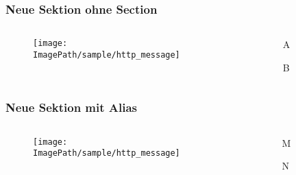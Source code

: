 
\begin{frame}
	\frametitle{Neue Sektion ohne Section}
	\begin{columns}
		\begin{column}{0.5\textwidth}
			\begin{figure}
				\centering
				\texttt{[image: \\ImagePath/sample/http\_message]}
			\end{figure}
		\end{column}
		\begin{column}{0.5\textwidth}
			\begin{steps}
				\item A
				\item B
			\end{steps}
		\end{column}
	\end{columns}
\end{frame}


\begin{frame}
	\frametitle{Neue Sektion mit Alias}
	\begin{columns}
		\begin{column}{0.5\textwidth}
			\begin{figure}
				\centering
				\texttt{[image: \\ImagePath/sample/http\_message]}
			\end{figure}
		\end{column}
		\begin{column}{0.5\textwidth}
			\begin{steps}
				\item M
				\item N
			\end{steps}
		\end{column}
	\end{columns}
\end{frame}





